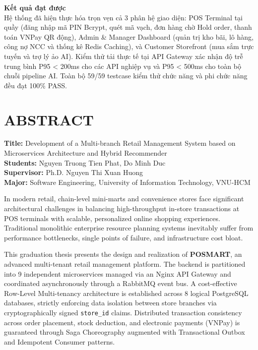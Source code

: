 \documentclass[12pt,a4paper]{report}
\begin{document}
\vspace{0.4cm}
\textbf{Kết quả đạt được}\\
Hệ thống đã hiện thực hóa trọn vẹn cả 3 phân hệ giao diện: POS Terminal tại quầy (đăng nhập mã PIN Bcrypt, quét mã vạch, đơn hàng chờ Hold order, thanh toán VNPay QR động), Admin \& Manager Dashboard (quản trị kho bãi, lô hàng, công nợ NCC và thống kê Redis Caching), và Customer Storefront (mua sắm trực tuyến và trợ lý ảo AI). Kiểm thử tải thực tế tại API Gateway xác nhận độ trễ trung bình P95 < 200ms cho các API nghiệp vụ và P95 < 500ms cho toàn bộ chuỗi pipeline AI. Toàn bộ 59/59 testcase kiểm thử chức năng và phi chức năng đều đạt 100\% PASS.

\newpage
\chapter*{ABSTRACT}

\noindent\textbf{Title:} Development of a Multi-branch Retail Management System based on Microservices Architecture and Hybrid Recommender\\
\textbf{Students:} Nguyen Truong Tien Phat, Do Minh Duc\\
\textbf{Supervisor:} Ph.D. Nguyen Thi Xuan Huong\\
\textbf{Major:} Software Engineering, University of Information Technology, VNU-HCM

\vspace{0.5cm}
In modern retail, chain-level mini-marts and convenience stores face significant architectural challenges in balancing high-throughput in-store transactions at POS terminals with scalable, personalized online shopping experiences. Traditional monolithic enterprise resource planning systems inevitably suffer from performance bottlenecks, single points of failure, and infrastructure cost bloat. 

This graduation thesis presents the design and realization of \textbf{POSMART}, an advanced multi-tenant retail management platform. The backend is partitioned into 9 independent microservices managed via an Nginx API Gateway and coordinated asynchronously through a RabbitMQ event bus. A cost-effective Row-Level Multi-tenancy architecture is established across 8 logical PostgreSQL databases, strictly enforcing data isolation between store branches via cryptographically signed \texttt{store\_id} claims. Distributed transaction consistency across order placement, stock deduction, and electronic payments (VNPay) is guaranteed through Saga Choreography augmented with Transactional Outbox and Idempotent Consumer patterns. 
\end{document}

